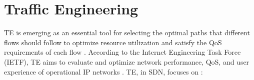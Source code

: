 
\section{Traffic Engineering}
\label{sec:background-te}

TE is emerging as an essential tool for selecting the optimal paths that different flows should follow to optimize resource utilization and satisfy the QoS requirements of each flow \cite{ian_2014:a_road_map_sdn, shu_2016:traffic_measurement_management}. According to the Internet Engineering Task Force (IETF), TE aims to evaluate and optimize network performance, QoS, and user experience of operational IP networks \cite{feamster_2014:road_sdn, awduche_2002:overview_ti, wang_2008:overview_routing_ti}. TE, in SDN, focuses on \cite{ian_2014:a_road_map_sdn}:

